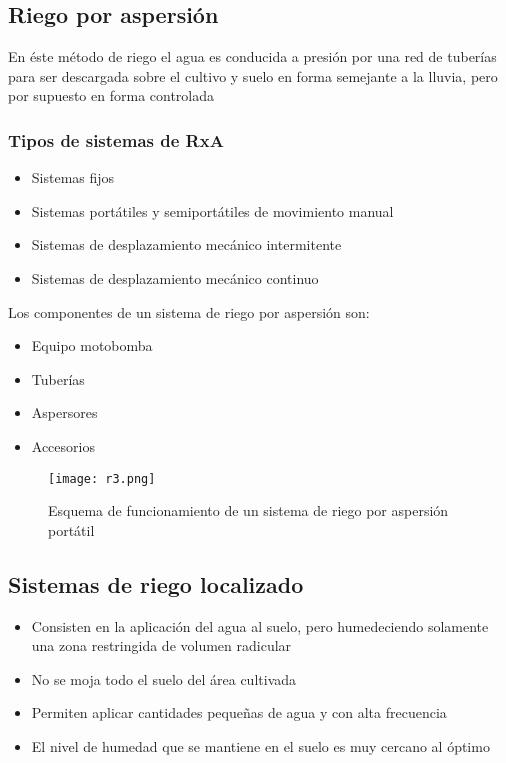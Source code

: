 \subsection{Riego por aspersión}
En éste método de riego el agua es conducida a presión por una red de tuberías para ser descargada sobre el cultivo y suelo en forma semejante a la lluvia, pero por supuesto en forma controlada
\subsubsection{Tipos de sistemas de RxA}
\begin{itemize}
    \item Sistemas fijos
    \item Sistemas portátiles y semiportátiles de movimiento manual
    \item Sistemas de desplazamiento mecánico intermitente
    \item Sistemas de desplazamiento mecánico continuo
\end{itemize}
Los componentes de un sistema de riego por aspersión son:
\begin{itemize}
    \item Equipo motobomba
    \item Tuberías
    \item Aspersores
    \item Accesorios
\end{itemize}
\begin{figure}[h!]
\centering
  \texttt{[image: r3.png]}
  \caption{Esquema de funcionamiento de un sistema de riego por aspersión portátil}
  \label{r3}
\end{figure}
\subsection{Sistemas de riego localizado}
\begin{itemize}
    \item Consisten en la aplicación del agua al suelo, pero humedeciendo solamente una zona restringida de volumen radicular
    \item No se moja todo el suelo del área cultivada
    \item Permiten aplicar cantidades pequeñas de agua y con alta frecuencia
    \item El nivel de humedad que se mantiene en el suelo es muy cercano al óptimo
\end{itemize}
